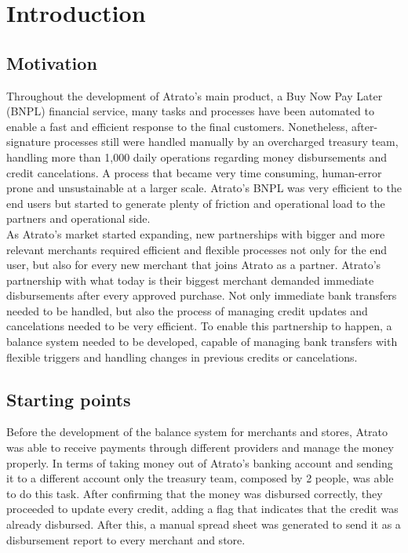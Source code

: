 \chapter{Introduction}
\setcounter{page}{1}


\section{Motivation}

Throughout the development of Atrato’s main product, a Buy Now Pay Later (BNPL) financial service, many tasks and processes have been automated to enable a fast and efficient response to the final customers. Nonetheless, after-signature processes still were handled manually by an overcharged treasury team, handling more than 1,000 daily operations regarding money disbursements and credit cancelations. A process that became very time consuming, human-error prone and unsustainable at a larger scale. Atrato’s BNPL was very efficient to the end users but started to generate plenty of friction and operational load to the partners and operational side.\\

As Atrato’s market started expanding, new partnerships with bigger and more relevant merchants required efficient and flexible processes not only for the end user, but also for every new merchant that joins Atrato as a partner. Atrato’s partnership with what today is their biggest merchant demanded immediate disbursements after every approved purchase. Not only immediate bank transfers needed to be handled, but also the process of managing credit updates and cancelations needed to be very efficient. To enable this partnership to happen, a balance system needed to be developed, capable of managing bank transfers with flexible triggers and handling changes in previous credits or cancelations.


\section{Starting points}

Before the development of the balance system for merchants and stores, Atrato was able to receive payments through different providers and manage the money properly.  In terms of taking money out of Atrato’s banking account and sending it to a different account only the treasury team, composed by 2 people, was able to do this task. After confirming that the money was disbursed correctly, they proceeded to update every credit, adding a flag that indicates that the credit was already disbursed. After this, a manual spread sheet was generated to send it as a disbursement report to every merchant and store.\\


